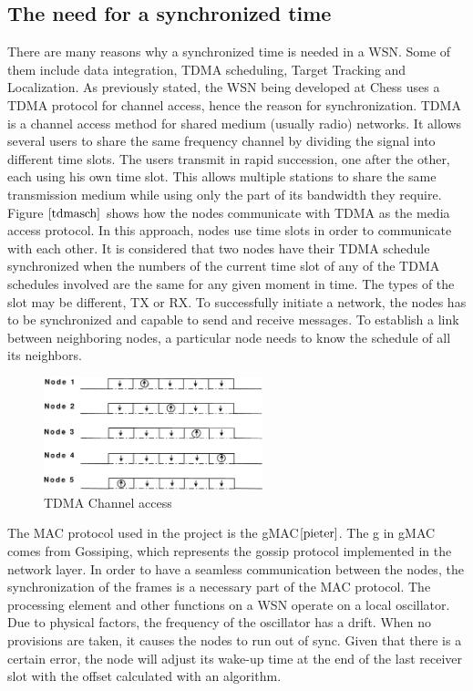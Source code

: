 \documentclass[journal]{IEEEtran}
\begin{document}
\subsection{\textbf{The need for a synchronized time}}
There are many reasons why a synchronized time is needed in a WSN.
Some of them include data integration, TDMA scheduling, Target
Tracking and Localization. As previously stated, the WSN being
developed at Chess uses a TDMA protocol for channel access, hence
the reason for synchronization.
\newline TDMA is a channel access method for shared medium (usually
radio) networks. It allows several users to share the same frequency
channel by dividing the signal into different time slots. The users
transmit in rapid succession, one after the other, each using his
own time slot. This allows multiple stations to share the same
transmission medium while using only the part of its bandwidth they
require. Figure $\ref{tdmasch}$ shows how the nodes communicate with
TDMA as the media access protocol.
\newline In this approach, nodes use time slots in order to
communicate with each other. It is considered that two nodes have
their TDMA schedule synchronized when the numbers of the current
time slot of any of the TDMA schedules involved are the same for any
given moment in time. The types of the slot may be different, TX or
RX. To successfully initiate a network, the nodes has to be
synchronized and capable to send and receive messages. To establish
a link between neighboring nodes, a particular node needs to know
the schedule of all its neighbors.
\begin{figure}
\begin{center}
\includegraphics[width=2.5in]{tdmaschedule}
\caption{TDMA Channel access} \label{tdmasch}
\end{center}
\end{figure}
The MAC protocol used in the project is the gMAC$\cite{pieter}$. The
g in gMAC comes from Gossiping, which represents the gossip protocol
implemented in the network layer.
\newline
In order to have a seamless communication between the nodes, the
synchronization of the frames is a necessary part of the MAC
protocol. The processing element and other functions on a WSN
operate on a local oscillator. Due to physical factors, the
frequency of the oscillator has a drift. When no provisions are
taken, it causes the nodes to run out of sync. Given that there is a
certain error, the node will adjust its wake-up time at the end of
the last receiver slot with the offset calculated with an algorithm.
\end{document}
